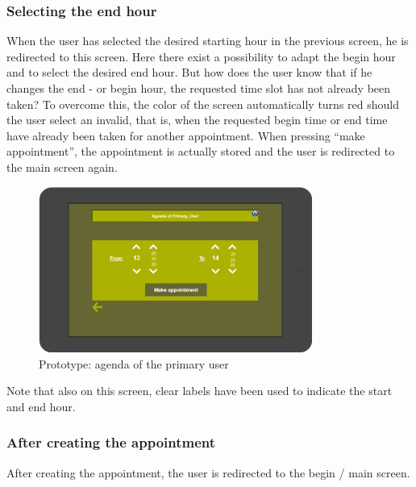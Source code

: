 \documentclass[11pt, a4paper,svglistings]{report}
\begin{document}

\subsubsection{Selecting the end hour}

When the user has selected the desired starting hour in the previous screen, he is redirected to this screen. Here there exist a possibility to adapt the begin hour and to select the desired end hour. But how does the user know that if he changes the end - or begin hour, the requested time slot has not already been taken? To overcome this, the color of the screen automatically turns red should the user select an invalid, that is, when the requested begin time or end time have already been taken for another appointment. When pressing ``make appointment'', the appointment is actually stored and the user is redirected to the main screen again.

\begin{figure}[H]
\centering
    \includegraphics[width=0.8\textwidth]{Prototypes/MaakAfspraakUur.png}
  \caption{Prototype: agenda of the primary user}
\end{figure}
Note that also on this screen, clear labels have been used to indicate the start and end hour.


\subsubsection{After creating the appointment}

After creating the appointment, the user is redirected to the begin / main screen.
\end{document}
